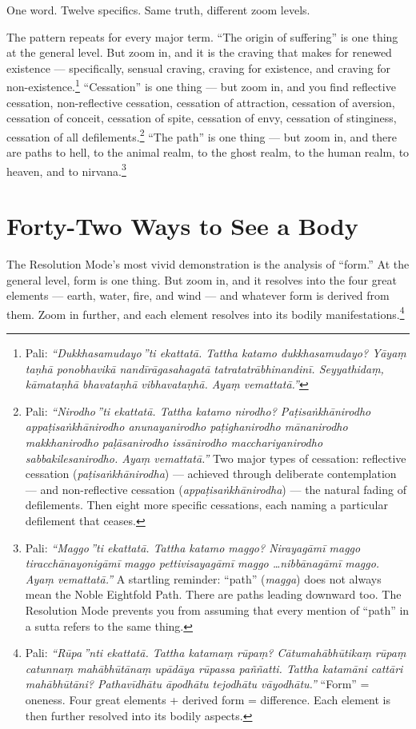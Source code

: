 One word. Twelve specifics. Same truth, different zoom levels.

The pattern repeats for every major term. ``The origin of suffering'' is one thing at the general level. But zoom in, and it is the craving that makes for renewed existence --- specifically, sensual craving, craving for existence, and craving for non-existence.\footnote{Pali: \textit{``Dukkhasamudayo\,''ti ekattatā. Tattha katamo dukkhasamudayo? Yāyaṃ taṇhā ponobhavikā nandīrāgasahagatā tatratatrābhinandinī. Seyyathidaṃ, kāmataṇhā bhavataṇhā vibhavataṇhā. Ayaṃ vemattatā.''}} ``Cessation'' is one thing --- but zoom in, and you find reflective cessation, non-reflective cessation, cessation of attraction, cessation of aversion, cessation of conceit, cessation of spite, cessation of envy, cessation of stinginess, cessation of all defilements.\footnote{Pali: \textit{``Nirodho\,''ti ekattatā. Tattha katamo nirodho? Paṭisaṅkhānirodho appaṭisaṅkhānirodho anunayanirodho paṭighanirodho mānanirodho makkhanirodho paḷāsanirodho issānirodho macchariyanirodho sabbakilesanirodho. Ayaṃ vemattatā.''} Two major types of cessation: reflective cessation (\textit{paṭisaṅkhānirodha}) --- achieved through deliberate contemplation --- and non-reflective cessation (\textit{appaṭisaṅkhānirodha}) --- the natural fading of defilements. Then eight more specific cessations, each naming a particular defilement that ceases.} ``The path'' is one thing --- but zoom in, and there are paths to hell, to the animal realm, to the ghost realm, to the human realm, to heaven, and to nirvana.\footnote{Pali: \textit{``Maggo\,''ti ekattatā. Tattha katamo maggo? Nirayagāmī maggo tiracchānayonigāmī maggo pettivisayagāmī maggo \ldots nibbānagāmī maggo. Ayaṃ vemattatā.''} A startling reminder: ``path'' (\textit{magga}) does not always mean the Noble Eightfold Path. There are paths leading downward too. The Resolution Mode prevents you from assuming that every mention of ``path'' in a sutta refers to the same thing.}

\section*{Forty-Two Ways to See a Body}

The Resolution Mode's most vivid demonstration is the analysis of ``form.'' At the general level, form is one thing. But zoom in, and it resolves into the four great elements --- earth, water, fire, and wind --- and whatever form is derived from them. Zoom in further, and each element resolves into its bodily manifestations.\footnote{Pali: \textit{``Rūpa\,''nti ekattatā. Tattha katamaṃ rūpaṃ? Cātumahābhūtikaṃ rūpaṃ catunnaṃ mahābhūtānaṃ upādāya rūpassa paññatti. Tattha katamāni cattāri mahābhūtāni? Pathavīdhātu āpodhātu tejodhātu vāyodhātu.''} ``Form'' = oneness. Four great elements + derived form = difference. Each element is then further resolved into its bodily aspects.}

